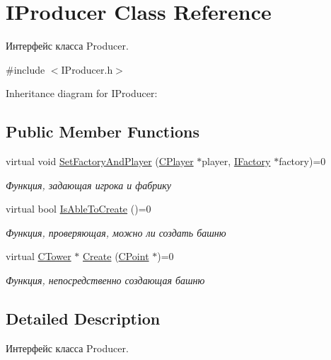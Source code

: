 \hypertarget{classIProducer}{}\section{I\+Producer Class Reference}
\label{classIProducer}


Интерфейс класса Producer.  




{\ttfamily \#include $<$I\+Producer.\+h$>$}



Inheritance diagram for I\+Producer\+:
\subsection*{Public Member Functions}
\begin{DoxyCompactItemize}
\item 
virtual void \hyperlink{classIProducer_a5432b60205e45d23d0ec57f92d1c670f}{Set\+Factory\+And\+Player} (\hyperlink{classCPlayer}{C\+Player} $\ast$player, \hyperlink{classIFactory}{I\+Factory} $\ast$factory)=0
\begin{DoxyCompactList}\small\item\em Функция, задающая игрока и фабрику \end{DoxyCompactList}\item 
virtual bool \hyperlink{classIProducer_afb1c0b7deae16b1cb94e6639e2fef99b}{Is\+Able\+To\+Create} ()=0\hypertarget{classIProducer_afb1c0b7deae16b1cb94e6639e2fef99b}{}\label{classIProducer_afb1c0b7deae16b1cb94e6639e2fef99b}

\begin{DoxyCompactList}\small\item\em Функция, проверяющая, можно ли создать башню \end{DoxyCompactList}\item 
virtual \hyperlink{classCTower}{C\+Tower} $\ast$ \hyperlink{classIProducer_a2395dc29b79b0116d799ee9944f631e3}{Create} (\hyperlink{classCPoint}{C\+Point} $\ast$)=0
\begin{DoxyCompactList}\small\item\em Функция, непосредственно создающая башню \end{DoxyCompactList}\end{DoxyCompactItemize}


\subsection{Detailed Description}
Интерфейс класса Producer. 

